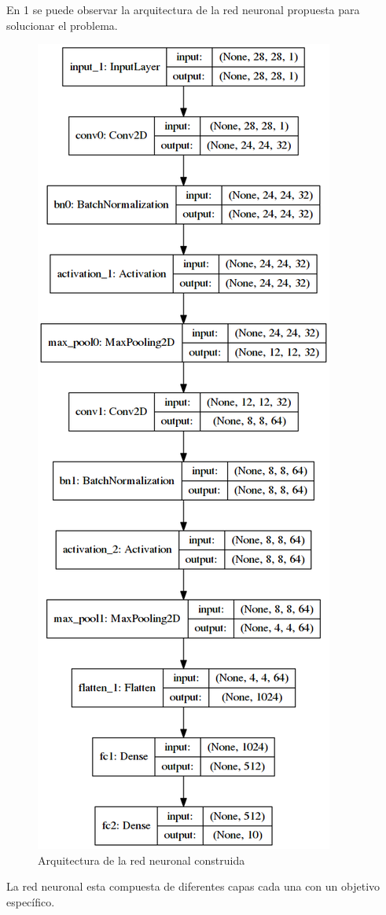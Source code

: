 \documentclass{article}
\begin{document}
En 1 se puede observar la arquitectura de la red neuronal propuesta para solucionar el problema.
\begin{figure}[H]
  \caption{Arquitectura de la red neuronal construida}
  \centering
  \includegraphics[scale=.40]{model_plot}
\end{figure}
La red neuronal esta compuesta de diferentes capas cada una con un objetivo espec\'ifico.
\end{document}
